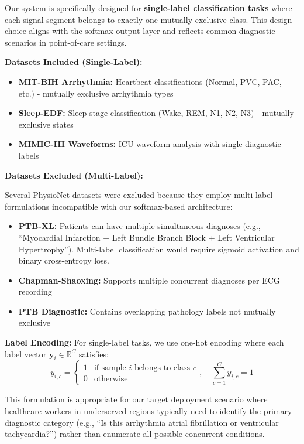 \documentclass[conference]{IEEEtran}
\begin{document}
Our system is specifically designed for \textbf{single-label classification tasks} where each signal segment belongs to exactly one mutually exclusive class. This design choice aligns with the softmax output layer and reflects common diagnostic scenarios in point-of-care settings.

\textbf{Datasets Included (Single-Label):}
\begin{itemize}
\item \textbf{MIT-BIH Arrhythmia:} Heartbeat classifications (Normal, PVC, PAC, etc.) - mutually exclusive arrhythmia types
\item \textbf{Sleep-EDF:} Sleep stage classification (Wake, REM, N1, N2, N3) - mutually exclusive states
\item \textbf{MIMIC-III Waveforms:} ICU waveform analysis with single diagnostic labels
\end{itemize}

\textbf{Datasets Excluded (Multi-Label):}

Several PhysioNet datasets were excluded because they employ multi-label formulations incompatible with our softmax-based architecture:

\begin{itemize}
\item \textbf{PTB-XL:} Patients can have multiple simultaneous diagnoses (e.g., ``Myocardial Infarction + Left Bundle Branch Block + Left Ventricular Hypertrophy''). Multi-label classification would require sigmoid activation and binary cross-entropy loss.
\item \textbf{Chapman-Shaoxing:} Supports multiple concurrent diagnoses per ECG recording
\item \textbf{PTB Diagnostic:} Contains overlapping pathology labels not mutually exclusive
\end{itemize}

\textbf{Label Encoding:} For single-label tasks, we use one-hot encoding where each label vector $\mathbf{y}_i \in \mathbb{R}^C$ satisfies:
\begin{equation}
y_{i,c} =
\begin{cases}
1 & \text{if sample } i \text{ belongs to class } c \\
0 & \text{otherwise}
\end{cases}, \quad \sum_{c=1}^{C} y_{i,c} = 1
\end{equation}

This formulation is appropriate for our target deployment scenario where healthcare workers in underserved regions typically need to identify the primary diagnostic category (e.g., ``Is this arrhythmia atrial fibrillation or ventricular tachycardia?'') rather than enumerate all possible concurrent conditions.
\end{document}
